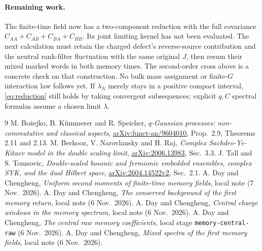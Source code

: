 \documentclass[11pt,a4paper]{article}
\begin{document}
\paragraph{Remaining work.}
The finite-time field now has a two-component reduction with the
full covariance $C_{AA}+C_{AB}+C_{BA}+C_{BB}$. Its joint limiting
kernel has not been evaluated. The next calculation must retain
the charged defect's reverse-source contribution and the neutral
rank-filter fluctuation with the same original $J$, then resum
their mixed marked words in both memory times. The second-order
cross above is a concrete check on that construction. No bulk
mass assignment or finite-$G$ interaction law follows yet.
If $\lambda_N$ merely stays in a positive compact interval,
\eqref{eq:reduction} still holds by taking convergent subsequences;
explicit $q,C$ spectral formulas assume a chosen limit $\lambda$.

\begin{thebibliography}{9}\small
{} M. Bo\.{z}ejko, B. K\"ummerer and R. Speicher,
\emph{$q$-Gaussian processes: non-commutative and classical aspects},
\href{https://arxiv.org/abs/funct-an/9604010}{arXiv:funct-an/9604010},
Prop.~2.9, Theorems 2.11 and 2.13.
 M. Berkooz, V. Narovlansky and H. Raj,
\emph{Complex Sachdev-Ye-Kitaev model in the double scaling limit},
\href{https://arxiv.org/abs/2006.13983}{arXiv:2006.13983}, Sec.~3.3.
 J. Tall and S. Tomsovic,
\emph{Double-scaled bosonic and fermionic embedded ensembles,
complex SYK, and the dual Hilbert space},
\href{https://arxiv.org/abs/2604.14522}{arXiv:2604.14522v2}, Sec.~2.1.
 A. Day and Chengheng,
\emph{Uniform second moments of finite-time memory fields}, local note (7 Nov.~2026).
 A. Day and Chengheng,
\emph{The conserved background of the first memory return}, local note (6 Nov.~2026).
 A. Day and Chengheng,
\emph{Central charge windows in the memory spectrum}, local note (6 Nov.~2026).
 A. Day and Chengheng,
\emph{The central raw memory coefficients}, local stage
\texttt{memory-central-raw} (6 Nov.~2026).
 A. Day and Chengheng,
\emph{Mixed spectra of the first memory fields}, local note (6 Nov.~2026).
\end{thebibliography}
\end{document}
